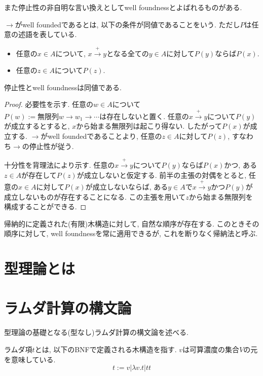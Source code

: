 \documentclass{ltjsarticle}
\begin{document}
また停止性の非自明な言い換えとしてwell foundnessとよばれるものがある.

\begin{defn}
$\rightarrow$がwell foundedであるとは, 以下の条件が同値であることをいう. ただし$P$は任意の述語を表している.
 \begin{itemize}
  \item 任意の$x \in A$について, $x \xrightarrow{+} y$となる全ての$y \in A$に対して$P(y)$ならば$P(x)$.
  \item 任意の$z \in A$について$P(z)$.
 \end{itemize}
\end{defn}

\begin{thm}
 停止性とwell foundnessは同値である.
\end{thm}

\begin{proof}
 必要性を示す. 任意の$w \in A$について$P(w):= \text{無限列} w \rightarrow w_1 \rightarrow \cdots \text{は存在しない}$と置く. 任意の$x \xrightarrow{+} y$について$P(y)$が成立するとすると, $x$から始まる無限列は起こり得ない. したがって$P(x)$が成立する. $\rightarrow$がwell foundedであることより, 任意の$z \in A$に対して$P(z)$, すなわち$\rightarrow$の停止性が従う.
 
 十分性を背理法により示す. 任意の$x \xrightarrow{+} y$について$P(y)$ならば$P(x)$かつ, ある$z \in A$が存在して$P(z)$が成立しないと仮定する. 前半の主張の対偶をとると, 任意の$x \in A$に対して$P(x)$が成立しないならば, ある$y \in A$で$x \xrightarrow{+} y$かつ$P(y)$が成立しないものが存在することになる. この主張を用いて$z$から始まる無限列を構成することができる.
\end{proof}

\begin{rem}
帰納的に定義された(有限)木構造に対して, 自然な順序が存在する.
このときその順序に対して, well foundnessを常に適用できるが, これを断りなく帰納法と呼ぶ.
\end{rem}

\section{型理論とは}

\section{ラムダ計算の構文論}
型理論の基礎となる(型なし)ラムダ計算の構文論を述べる.

\begin{defn}
 ラムダ項$t$とは, 以下のBNFで定義される木構造を指す. $v$は可算濃度の集合$V$の元を意味している.
 \[
 t := v | \lambda v. t | t t
 \]
\end{defn}
\end{document}
